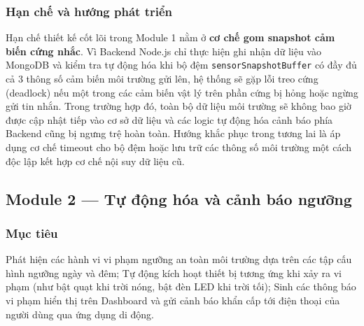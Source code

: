 

\subsubsection{Hạn chế và hướng phát triển}
Hạn chế thiết kế cốt lõi trong Module 1 nằm ở \textbf{cơ chế gom snapshot cảm biến cứng nhắc}. Vì Backend Node.js chỉ thực hiện ghi nhận dữ liệu vào MongoDB và kiểm tra tự động hóa khi bộ đệm \texttt{sensorSnapshotBuffer} có đầy đủ cả 3 thông số cảm biến môi trường gửi lên, hệ thống sẽ gặp lỗi treo cứng (deadlock) nếu một trong các cảm biến vật lý trên phần cứng bị hỏng hoặc ngừng gửi tin nhắn. Trong trường hợp đó, toàn bộ dữ liệu môi trường sẽ không bao giờ được cập nhật tiếp vào cơ sở dữ liệu và các logic tự động hóa cảnh báo phía Backend cũng bị ngưng trệ hoàn toàn. Hướng khắc phục trong tương lai là áp dụng cơ chế timeout cho bộ đệm hoặc lưu trữ các thông số môi trường một cách độc lập kết hợp cơ chế nội suy dữ liệu cũ.

\subsection{Module 2 --- Tự động hóa và cảnh báo ngưỡng}

\subsubsection{Mục tiêu}
Phát hiện các hành vi vi phạm ngưỡng an toàn môi trường dựa trên các tập cấu hình ngưỡng ngày và đêm; Tự động kích hoạt thiết bị tương ứng khi xảy ra vi phạm (như bật quạt khi trời nóng, bật đèn LED khi trời tối); Sinh các thông báo vi phạm hiển thị trên Dashboard và gửi cảnh báo khẩn cấp tới điện thoại của người dùng qua ứng dụng di động.

